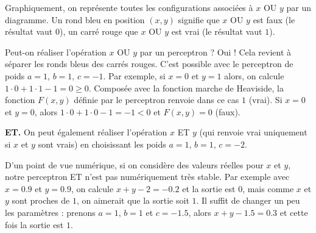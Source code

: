 Graphiquement, on représente toutes les configurations associées à \og{}$x$ OU $y$\fg{} par un diagramme. Un rond bleu en position $(x,y)$ signifie que \og{}$x$ OU $y$\fg{} est faux (le résultat vaut $0$), un carré rouge que \og{}$x$ OU $y$\fg{} est vrai (le résultat vaut $1$).



Peut-on réaliser l'opération \og{}$x$ OU $y$\fg{} par un perceptron ? 
Oui ! Cela revient à séparer les ronds bleus des carrés rouges.
C'est possible avec le perceptron de poids $a=1$, $b=1$, $c=-1$.
Par exemple, si $x=0$ et $y=1$ alors, on calcule $1\cdot0+1\cdot1-1 = 0 \ge0$. Composée avec la fonction marche de Heaviside, la fonction $F(x,y)$
définie par le perceptron renvoie dans ce cas $1$ (\og{}vrai\fg{}).
Si $x=0$ et $y=0$, alors $1\cdot0+1\cdot0-1 = -1 <0$ et $F(x,y)=0$ (\og{}faux\fg{}).

\begin{center}
	\begin{minipage}{0.35\textwidth}
	\end{minipage}
	\begin{minipage}{0.45\textwidth}
	\end{minipage}
\end{center}


\bigskip
\textbf{ET.}
On peut également réaliser l'opération \og{}$x$ ET $y$\fg{} (qui renvoie \og{}vrai\fg{} uniquement si $x$ et $y$ sont vrais) en choisissant les poids $a=1$, $b=1$, $c=-2$.

\begin{center}
	\begin{minipage}{0.35\textwidth}
	\end{minipage}
	\begin{minipage}{0.45\textwidth}
	\end{minipage}
\end{center}

	D'un point de vue numérique, si on considère des valeurs réelles pour $x$ et $y$, notre perceptron \og{}ET\fg{} n'est pas numériquement très stable.
	Par exemple avec $x=0.9$ et $y=0.9$, on calcule $x+y-2=-0.2$ et la sortie est $0$, mais comme $x$ et $y$ sont proches de $1$, on aimerait que la sortie soit $1$.
	Il suffit de changer un peu les paramètres : prenons $a=1$, $b=1$ et $c=-1.5$, alors $x+y-1.5=0.3$ et cette fois la sortie est $1$.

